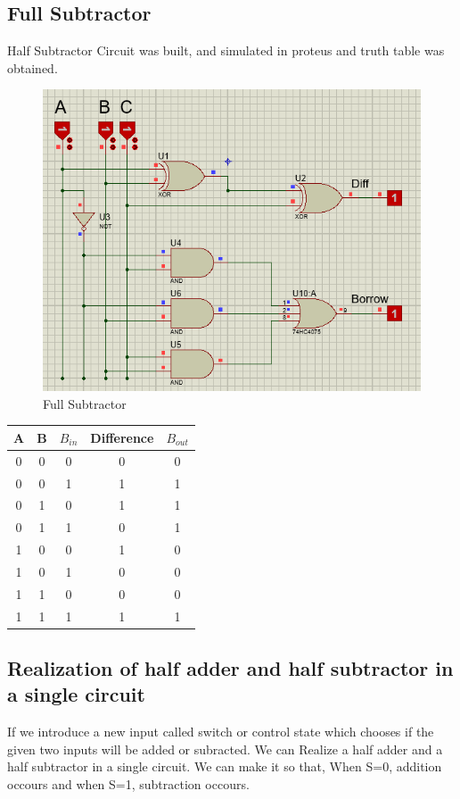 \documentclass[a4paper, 12pt]{article}
\begin{document}
\subsection{Full Subtractor}
Half Subtractor Circuit was built, and simulated in proteus and truth table was obtained.
\begin{figure}[h]
	\centering
	\includegraphics[scale=0.6]{full-sub.png}
	\caption{Full Subtractor}
\end{figure}

	\begin{center}
	\begin{tabular}[h]{|c|c|c|c|c|}
	\hline
	A & B & $B_{in}$ & Difference & $B_{out}$\\
	\hline
	0 & 0 & 0 & 0 & 0 \\
	0 & 0 & 1 & 1 & 1 \\
	0 & 1 & 0 & 1 & 1 \\
	0 & 1 & 1 & 0 & 1 \\
	1 & 0 & 0 & 1 & 0 \\
	1 & 0 & 1 & 0 & 0 \\
	1 & 1 & 0 & 0 & 0 \\
	1 & 1 & 1 & 1 & 1 \\
	\hline
	\end{tabular}
	\end{center}

\pagebreak

\subsection{Realization of half adder and half subtractor in a single circuit}
If we introduce a new input called switch or control state which chooses if the given two inputs will be added or subracted. We can Realize
a half adder and a half subtractor in a single circuit. We can make it so that, When S=0, addition occours and when S=1, subtraction occours.
\end{document}

